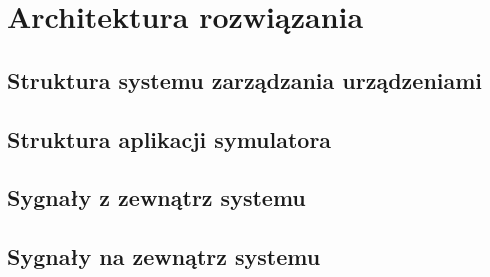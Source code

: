 \chapter{Architektura rozwiązania}
\section{Struktura systemu zarządzania urządzeniami}
\section{Struktura aplikacji symulatora}
\section{Sygnały z zewnątrz systemu} 
\section{Sygnały na zewnątrz systemu}
